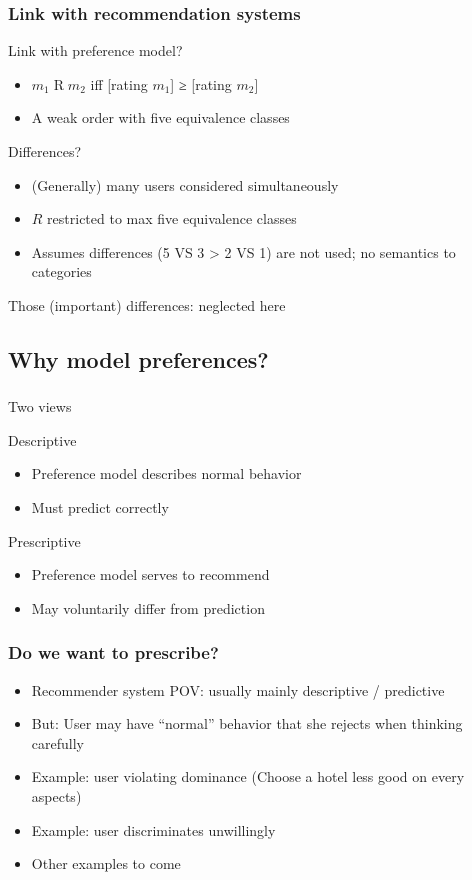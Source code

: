 \documentclass[french,english]{beamer}
\begin{document}
\begin{frame}
	\frametitle{Link with recommendation systems}
	Link with preference model?
	\begin{itemize}
		\item $m_1 \mathrel{R} m_2$ iff [rating $m_1$] ≥ [rating $m_2$]
		\item A weak order with five equivalence classes
	\end{itemize}
	Differences?
	\begin{itemize}
		\item (Generally) many users considered simultaneously
		\item $R$ restricted to max five equivalence classes
		\item Assumes differences (5 VS 3 > 2 VS 1) are not used; no semantics to categories
	\end{itemize}
	Those (important) differences: neglected here
\end{frame}

\subsection{Why model preferences?}
\begin{frame}
	\frametitle{\subsecname}
	Two views
	\begin{block}{Descriptive}
		\begin{itemize}
			\item Preference model describes normal behavior
			\item Must predict correctly
		\end{itemize}
	\end{block}
	\begin{block}{Prescriptive}
		\begin{itemize}
			\item Preference model serves to recommend
			\item May voluntarily differ from prediction
		\end{itemize}
	\end{block}
\end{frame}

\begin{frame}
	\frametitle{Do we want to prescribe?}
	\begin{itemize}
		\item Recommender system POV: usually mainly descriptive / predictive
		\item But: User may have “normal” behavior that she rejects when thinking carefully
		\item Example: user violating dominance (Choose a hotel less good on every aspects)
		\item Example: user discriminates unwillingly
		\item Other examples to come
	\end{itemize}
\end{frame}
\end{document}
